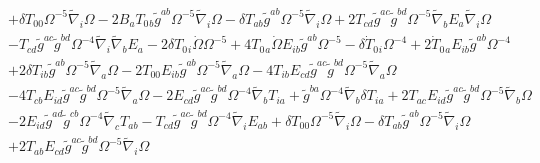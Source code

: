 \documentclass[10pt,letterpaper]{article}
\numberwithin{equation}{section}
\begin{document}
\begin{eqnarray}
&& + \delta T_{00}{} \Omega^{-5} \tilde{\nabla}_{i}\Omega - 2 B_{a} T_{0}{}_{b} \tilde{g}^{ab} \Omega^{-5} \tilde{\nabla}_{i}\Omega -  \delta T_{ab} \tilde{g}^{ab} \Omega^{-5} \tilde{\nabla}_{i}\Omega + 2 T_{cd} \tilde{g}^{ac} \tilde{g}^{bd} \Omega^{-5} \tilde{\nabla}_{b}E_{a} \tilde{\nabla}_{i}\Omega \nonumber \\ 
&& -  T_{cd} \tilde{g}^{ac} \tilde{g}^{bd} \Omega^{-4} \tilde{\nabla}_{i}\tilde{\nabla}_{b}E_{a}-2 \delta T_{0}{}_{i} \dot{\Omega} \Omega^{-5} + 4 T_{0}{}_{a} \dot{\Omega} E_{ib} \tilde{g}^{ab} \Omega^{-5} -  \delta \dot{T}_{0}{}_{i} \Omega^{-4} + 2 \dot{T}_{0}{}_{a} E_{ib} \tilde{g}^{ab} \Omega^{-4} \nonumber \\ 
&& + 2 \delta T_{ib} \tilde{g}^{ab} \Omega^{-5} \tilde{\nabla}_{a}\Omega - 2 T_{00}{} E_{ib} \tilde{g}^{ab} \Omega^{-5} \tilde{\nabla}_{a}\Omega - 4 T_{ib} E_{cd} \tilde{g}^{ac} \tilde{g}^{bd} \Omega^{-5} \tilde{\nabla}_{a}\Omega \nonumber \\ 
&& - 4 T_{cb} E_{id} \tilde{g}^{ac} \tilde{g}^{bd} \Omega^{-5} \tilde{\nabla}_{a}\Omega - 2 E_{cd} \tilde{g}^{ac} \tilde{g}^{bd} \Omega^{-4} \tilde{\nabla}_{b}T_{ia} + \tilde{g}^{ba} \Omega^{-4} \tilde{\nabla}_{b}\delta T_{ia} + 2 T_{ac} E_{id} \tilde{g}^{ac} \tilde{g}^{bd} \Omega^{-5} \tilde{\nabla}_{b}\Omega \nonumber \\ 
&& - 2 E_{id} \tilde{g}^{ad} \tilde{g}^{cb} \Omega^{-4} \tilde{\nabla}_{c}T_{ab} -  T_{cd} \tilde{g}^{ac} \tilde{g}^{bd} \Omega^{-4} \tilde{\nabla}_{i}E_{ab} + \delta T_{00}{} \Omega^{-5} \tilde{\nabla}_{i}\Omega -  \delta T_{ab} \tilde{g}^{ab} \Omega^{-5} \tilde{\nabla}_{i}\Omega \nonumber \\ 
&& + 2 T_{ab} E_{cd} \tilde{g}^{ac} \tilde{g}^{bd} \Omega^{-5} \tilde{\nabla}_{i}\Omega 
\end{eqnarray}

\end{document}
